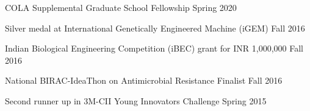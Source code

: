 COLA Supplemental Graduate School Fellowship \hfill Spring 2020

Silver medal at International Genetically Engineered Machine (iGEM) \hfill Fall 2016

Indian Biological Engineering Competition (iBEC) grant for INR 1,000,000 \hfill Fall 2016

National BIRAC-IdeaThon on Antimicrobial Resistance Finalist \hfill Fall 2016

Second runner up in 3M-CII Young Innovators Challenge \hfill Spring 2015

